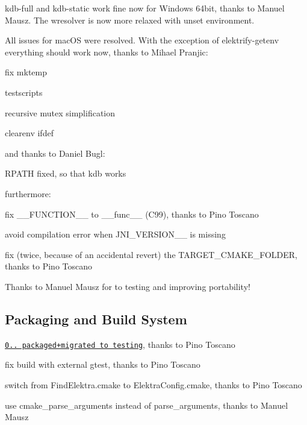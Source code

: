 {\ttfamily kdb-\/full} and {\ttfamily kdb-\/static} work fine now for Windows 64bit, thanks to Manuel Mausz. The wresolver is now more relaxed with unset environment.

All issues for mac\+OS were resolved. With the exception of elektrify-\/getenv everything should work now, thanks to Mihael Pranjic\+:


\begin{DoxyItemize}
\item fix mktemp
\item testscripts
\item recursive mutex simplification
\item clearenv ifdef
\end{DoxyItemize}

and thanks to Daniel Bugl\+:


\begin{DoxyItemize}
\item R\+P\+A\+TH fixed, so that {\ttfamily kdb} works
\end{DoxyItemize}

furthermore\+:


\begin{DoxyItemize}
\item fix {\ttfamily \+\_\+\+\_\+\+F\+U\+N\+C\+T\+I\+O\+N\+\_\+\+\_\+} to {\ttfamily \+\_\+\+\_\+func\+\_\+\+\_\+} (C99), thanks to Pino Toscano
\item avoid compilation error when J\+N\+I\+\_\+\+V\+E\+R\+S\+I\+O\+N\+\_\+\_ is missing
\item fix (twice, because of an accidental revert) the T\+A\+R\+G\+E\+T\+\_\+\+C\+M\+A\+K\+E\+\_\+\+F\+O\+L\+D\+ER, thanks to Pino Toscano
\end{DoxyItemize}

Thanks to Manuel Mausz for to testing and improving portability!

\subsection*{Packaging and Build System}


\begin{DoxyItemize}
\item \href{https://packages.qa.debian.org/e/elektra/news/20150726T155000Z.html}{\tt 0.. packaged+migrated to testing}, thanks to Pino Toscano
\item fix build with external gtest, thanks to Pino Toscano
\item switch from Find\+Elektra.\+cmake to Elektra\+Config.\+cmake, thanks to Pino Toscano
\item use {\ttfamily cmake\+\_\+parse\+\_\+arguments} instead of {\ttfamily parse\+\_\+arguments}, thanks to Manuel Mausz
\end{DoxyItemize}

